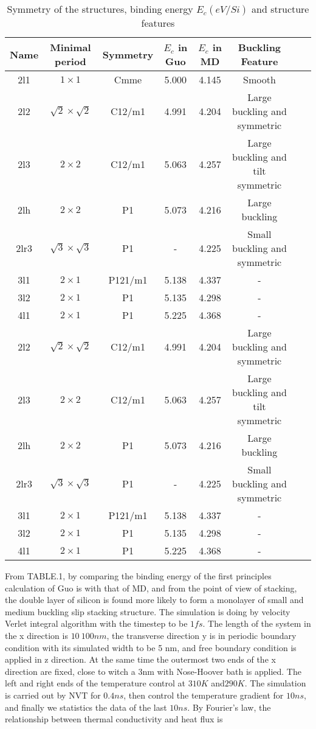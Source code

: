 \documentclass[%
 reprint,
 amsmath,amssymb,
 aps,
 prb,
]{revtex4-1}
\begin{document}
\begin{table*}
\caption{\label{tab:table1}
Symmetry of the structures, binding energy $E_c(eV/Si)$ and structure features}
\begin{ruledtabular}
\begin{tabular}{cccccccc}
 Name
 &Minimal period
 &Symmetry
 &$E_c$ in Guo
 &$E_c$ in MD
 &Buckling Feature\\
\hline
2l1 & $1 \times 1$ & Cmme & 5.000 &4.145 &Smooth \\
2l2 & $\sqrt{2}\times\sqrt{2}$ & C12/m1 & 4.991 & 4.204 & Large buckling and symmetric\\
2l3 & $2 \times 2$ & C12/m1 & 5.063 & 4.257 & Large buckling and tilt symmetric\\
2lh & $2 \times 2$ & P1 & 5.073 & 4.216 & Large buckling\\
2lr3 & $\sqrt{3}\times\sqrt{3}$ & P1 & - & 4.225 & Small buckling and symmetric\\
3l1 & $2 \times 1$ & P121/m1 & 5.138 & 4.337 & -\\
3l2 & $2 \times 1$ & P1 & 5.135 & 4.298 & -\\
4l1 & $2 \times 1$ & P1 & 5.225 & 4.368 & -\\
2l2 &$\sqrt{2}\times\sqrt{2}$ & C12/m1 & 4.991 & 4.204 & Large buckling and symmetric\\
2l3 & $2 \times 2$ & C12/m1 & 5.063 & 4.257 & Large buckling and tilt symmetric\\
2lh & $2 \times 2$ & P1 & 5.073 & 4.216 & Large buckling\\
2lr3 & $\sqrt{3}\times\sqrt{3}$ & P1 & - & 4.225 & Small buckling and symmetric\\
3l1 & $2 \times 1$ & P121/m1 & 5.138 & 4.337 & -\\
3l2 & $2 \times 1$ & P1 & 5.135 & 4.298 & -\\
4l1 & $2 \times 1$ & P1 & 5.225 & 4.368 & -\\

\end{tabular}
\end{ruledtabular}
\end{table*}

From TABLE.1, by comparing the binding energy of the first principles calculation of Guo is with that of MD, and from the point of view of stacking, the double layer of silicon is found more likely to form a monolayer of small and medium buckling slip stacking structure. The simulation is doing by velocity Verlet integral algorithm with the timestep to be $1 fs$. The length of the system in the x direction is $10~100nm$, the transverse direction y is in periodic boundary condition with its simulated width to be 5 nm, and free boundary condition is applied in z direction. At the same time the outermost two ends of the x direction are fixed, close to witch a 3nm with Nose-Hoover bath is applied. The left and right ends of the temperature control at $310K$ and$ 290K$. The simulation is carried out by NVT for $0.4ns$, then control the temperature gradient for $10 ns$, and finally we statistics the data of the last $10ns$. By Fourier's law, the relationship between thermal conductivity and heat flux is
\end{document}
